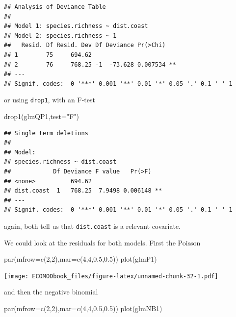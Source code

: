 \documentclass[
]{book}
\newenvironment{Shaded}{\begin{snugshade}}{\end{snugshade}}
\newcommand{\AttributeTok}[1]{\textcolor[rgb]{0.77,0.63,0.00}{#1}}
\newcommand{\DecValTok}[1]{\textcolor[rgb]{0.00,0.00,0.81}{#1}}
\newcommand{\FloatTok}[1]{\textcolor[rgb]{0.00,0.00,0.81}{#1}}
\newcommand{\FunctionTok}[1]{\textcolor[rgb]{0.00,0.00,0.00}{#1}}
\newcommand{\NormalTok}[1]{#1}
\newcommand{\StringTok}[1]{\textcolor[rgb]{0.31,0.60,0.02}{#1}}
\begin{document}
\begin{verbatim}
## Analysis of Deviance Table
## 
## Model 1: species.richness ~ dist.coast
## Model 2: species.richness ~ 1
##   Resid. Df Resid. Dev Df Deviance Pr(>Chi)   
## 1        75     694.62                        
## 2        76     768.25 -1  -73.628 0.007534 **
## ---
## Signif. codes:  0 '***' 0.001 '**' 0.01 '*' 0.05 '.' 0.1 ' ' 1
\end{verbatim}

or using \texttt{drop1}, with an F-test

\begin{Shaded}
\begin{Highlighting}[]
\FunctionTok{drop1}\NormalTok{(glmQP1,}\AttributeTok{test=}\StringTok{"F"}\NormalTok{)}
\end{Highlighting}
\end{Shaded}

\begin{verbatim}
## Single term deletions
## 
## Model:
## species.richness ~ dist.coast
##            Df Deviance F value   Pr(>F)   
## <none>          694.62                    
## dist.coast  1   768.25  7.9498 0.006148 **
## ---
## Signif. codes:  0 '***' 0.001 '**' 0.01 '*' 0.05 '.' 0.1 ' ' 1
\end{verbatim}

again, both tell us that \texttt{dist.coast} is a relevant covariate.

We could look at the residuals for both models. First the Poisson

\begin{Shaded}
\begin{Highlighting}[]
\FunctionTok{par}\NormalTok{(}\AttributeTok{mfrow=}\FunctionTok{c}\NormalTok{(}\DecValTok{2}\NormalTok{,}\DecValTok{2}\NormalTok{),}\AttributeTok{mar=}\FunctionTok{c}\NormalTok{(}\DecValTok{4}\NormalTok{,}\DecValTok{4}\NormalTok{,}\FloatTok{0.5}\NormalTok{,}\FloatTok{0.5}\NormalTok{))}
\FunctionTok{plot}\NormalTok{(glmP1)}
\end{Highlighting}
\end{Shaded}

\texttt{[image: ECOMODbook\_files/figure-latex/unnamed-chunk-32-1.pdf]}

and then the negative binomial

\begin{Shaded}
\begin{Highlighting}[]
\FunctionTok{par}\NormalTok{(}\AttributeTok{mfrow=}\FunctionTok{c}\NormalTok{(}\DecValTok{2}\NormalTok{,}\DecValTok{2}\NormalTok{),}\AttributeTok{mar=}\FunctionTok{c}\NormalTok{(}\DecValTok{4}\NormalTok{,}\DecValTok{4}\NormalTok{,}\FloatTok{0.5}\NormalTok{,}\FloatTok{0.5}\NormalTok{))}
\FunctionTok{plot}\NormalTok{(glmNB1)}
\end{Highlighting}
\end{Shaded}
\end{document}
